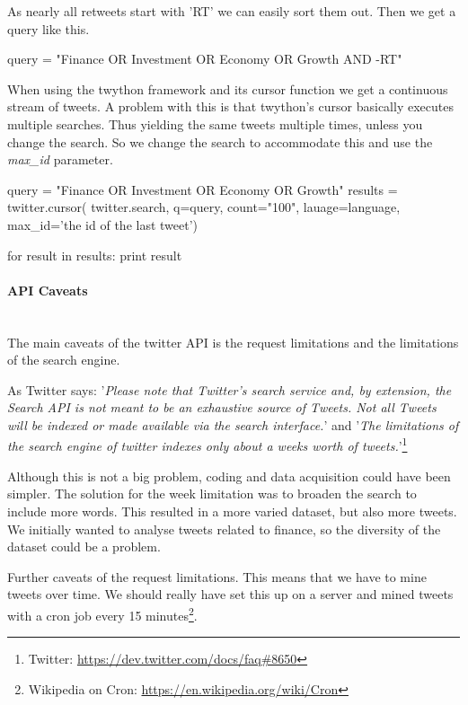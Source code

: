 As nearly all retweets start with 'RT' we can easily sort them out. Then we get
a query like this. 
\begin{python}
query = "Finance OR Investment OR Economy OR Growth AND -RT"
\end{python}

When using the twython framework and its cursor function we get a continuous
stream of tweets. A problem with this is that twython's cursor basically
executes multiple searches. Thus yielding the same tweets multiple times,
unless you change the search. So we change the search to accommodate this and
use the \textit{max\_id} parameter.
\begin{python}
query = "Finance OR Investment OR Economy OR Growth"
results = twitter.cursor(
                twitter.search,
                q=query,
                count="100",
                lauage=language,
                max_id='the id of the last tweet')

for result in results:
    print result
\end{python}
%

\paragraph{API Caveats}
\hspace{0pt}\\
The main caveats of the twitter API is the request limitations and the
limitations of the search engine. 

As Twitter says: 
'\textit{Please note that Twitter's search service and, by extension, the Search
API is not meant to be an exhaustive source of Tweets. Not all Tweets will be
indexed or made available via the search interface.}' and 
'\textit{The limitations of the search engine of twitter indexes only about a
weeks worth of tweets.}'\footnote{Twitter:
\url{https://dev.twitter.com/docs/faq#8650}}

Although this is not a big problem, coding and data acquisition could have been
simpler. The solution for the week limitation was to broaden the search to
include more words. This resulted in a more varied dataset, but also more
tweets. We initially wanted to analyse tweets related to finance, so the
diversity of the dataset could be a problem. 

Further caveats of the request limitations. This means that we have to mine
tweets over time. We should really have set this up on a server and mined
tweets with a cron job every 15 minutes\footnote{Wikipedia on Cron:
\url{https://en.wikipedia.org/wiki/Cron}}.
%

